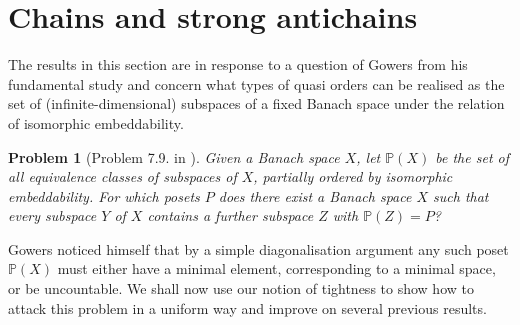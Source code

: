 \documentclass[10pt]{amsart}
\numberwithin{equation}{section}
\newtheorem{prob}[thm]{Problem}
\begin{document}
\section{Chains and strong antichains}\label{chains and posets}
The results in this section are in response to a question of Gowers from his
fundamental study \cite{g:dicho} and concern what types of quasi orders can be
realised as the set of (infinite-dimensional) subspaces of a fixed Banach space
under the relation of isomorphic embeddability.
\begin{prob}[Problem 7.9. in \cite{g:dicho}]\label{g:prob}
Given a Banach space $X$, let ${\mathbb P}(X)$ be the set of all equivalence classes of
subspaces of $X$, partially ordered by isomorphic embeddability. For which
posets $P$ does there exist a Banach space $X$ such that every subspace $Y$ of
$X$ contains a further subspace $Z$ with ${\mathbb P}(Z) = P$?
\end{prob}
Gowers  noticed himself that by a simple diagonalisation argument any such
poset ${\mathbb P}(X)$ must either have a minimal element, corresponding to a minimal
space, or be uncountable. We shall now use our notion of tightness to show how
to attack this problem in a uniform way and  improve on several previous
results.
\end{document}
